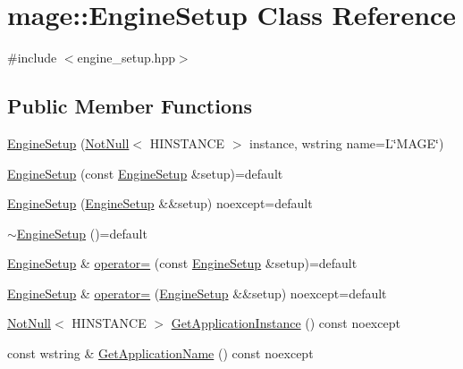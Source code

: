 \hypertarget{classmage_1_1_engine_setup}{}\section{mage\+:\+:Engine\+Setup Class Reference}
\label{classmage_1_1_engine_setup}


{\ttfamily \#include $<$engine\+\_\+setup.\+hpp$>$}

\subsection*{Public Member Functions}
\begin{DoxyCompactItemize}
\item 
\mbox{\hyperlink{classmage_1_1_engine_setup_a5276975dd2274445f3de58d6666eb37d}{Engine\+Setup}} (\mbox{\hyperlink{namespacemage_a8769f9d670d6b585ea306cb1062af94b}{Not\+Null}}$<$ H\+I\+N\+S\+T\+A\+N\+CE $>$ instance, wstring name=L\char`\"{}M\+A\+GE\char`\"{})
\item 
\mbox{\hyperlink{classmage_1_1_engine_setup_a40980f5fce1554c2a93707efdf4486a9}{Engine\+Setup}} (const \mbox{\hyperlink{classmage_1_1_engine_setup}{Engine\+Setup}} \&setup)=default
\item 
\mbox{\hyperlink{classmage_1_1_engine_setup_a22b87954ad7a2bc26ff7f26fb443c58c}{Engine\+Setup}} (\mbox{\hyperlink{classmage_1_1_engine_setup}{Engine\+Setup}} \&\&setup) noexcept=default
\item 
\mbox{\hyperlink{classmage_1_1_engine_setup_a0480bee101756b72233a1aa7d44eb185}{$\sim$\+Engine\+Setup}} ()=default
\item 
\mbox{\hyperlink{classmage_1_1_engine_setup}{Engine\+Setup}} \& \mbox{\hyperlink{classmage_1_1_engine_setup_a4234ca6df84db6a2005b994ed42da11f}{operator=}} (const \mbox{\hyperlink{classmage_1_1_engine_setup}{Engine\+Setup}} \&setup)=default
\item 
\mbox{\hyperlink{classmage_1_1_engine_setup}{Engine\+Setup}} \& \mbox{\hyperlink{classmage_1_1_engine_setup_a4c2e71f96f138b28fd6ff1c088d05a53}{operator=}} (\mbox{\hyperlink{classmage_1_1_engine_setup}{Engine\+Setup}} \&\&setup) noexcept=default
\item 
\mbox{\hyperlink{namespacemage_a8769f9d670d6b585ea306cb1062af94b}{Not\+Null}}$<$ H\+I\+N\+S\+T\+A\+N\+CE $>$ \mbox{\hyperlink{classmage_1_1_engine_setup_a278a3df908b5b369a597812de4010532}{Get\+Application\+Instance}} () const noexcept
\item 
const wstring \& \mbox{\hyperlink{classmage_1_1_engine_setup_ab79015dba68069256ed42595b30a5728}{Get\+Application\+Name}} () const noexcept
\end{DoxyCompactItemize}
